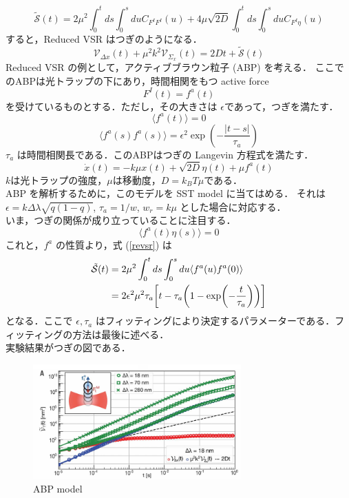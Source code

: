 \documentclass{jsarticle}
\numberwithin{equation}{section}
\theoremstyle{definition}
\newcommand{\ave}[1]{\langle #1 \rangle}
\begin{document}
\begin{equation}
  \label{revsr}
  \tilde{\mathcal{S}}(t) = 2\mu^2 \int_0^t ds \int_0^s du C_{F^I F^I} (u) + 4\mu \sqrt{2D} \int_0^t ds \int_0^s du C_{F^I \eta } (u)
\end{equation}
すると，Reduced VSR はつぎのようになる．
\begin{equation}
  \label{vsr5}
  \mathcal{V} _{\Delta x} (t) + \mu^2 k^2 \mathcal{V} _{\Sigma_x} (t) = 2Dt + \tilde{\mathcal{S}}(t)
\end{equation}
\quad Reduced VSR の例として，アクティブブラウン粒子 (ABP) を考える．
ここでのABPは光トラップの下にあり，時間相関をもつ active force 
\begin{equation}
  F^I (t) = f^a (t)
\end{equation}
を受けているものとする．ただし，その大きさは $\epsilon$であって，つぎを満たす．
\begin{equation}
  \ave{f^a (t)} = 0
\end{equation}
\begin{equation}
  \ave{f^a (s) f^a (s)} = \epsilon^2 \exp( - \frac{|t-s|}{\tau_a} )
\end{equation}
$\tau_a$ は時間相関長である．このABPはつぎの Langevin 方程式を満たす．
\begin{equation}
  \dot{x}(t) = -k \mu x(t) + \sqrt{2D} \eta(t) + \mu f^a (t)
\end{equation}
$k $は光トラップの強度，$\mu $は移動度，$D = k_B T \mu $である．\\
\quad ABP を解析するために，このモデルを SST model に当てはめる．
それは $\epsilon = k \Delta \lambda \sqrt{q(1-q)}$, $\tau_a = 1/w$, $w_r = k \mu $ とした場合に対応する．\\
\quad いま，つぎの関係が成り立っていることに注目する．
\begin{equation}
  \ave{f^a (t) \eta (s)} = 0
\end{equation}
これと，$f^a$ の性質より，式 (\ref{revsr}) は 
\begin{align}
  \tilde{\mathcal{S}}(t) &= 2\mu^2 \int_0^t ds \int_0^s du \ave{ f^a(u) f^a(0) } \\
  &= 2 \epsilon^2 \mu^2 \tau_a \qty[ t - \tau_a \qty(1- \exp(-\frac{t}{\tau_a})) ]
\end{align}
となる．ここで $\epsilon, \tau_a$ はフィッティングにより決定するパラメーターである．フィッティングの方法は最後に述べる．\\
\quad 実験結果がつぎの図である．

\begin{figure}[H]
  \begin{center}  
  \includegraphics[width=8cm]{vsr_fig3a.png}  
  \end{center}
  \caption{ABP model}
\end{figure}
\end{document}

